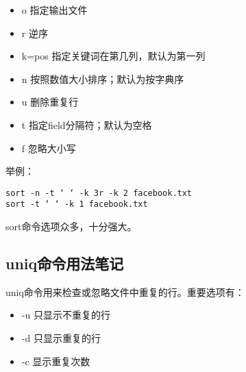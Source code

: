 \begin{itemize}
    \item o 指定输出文件
    \item r 逆序
    \item k=pos 指定关键词在第几列，默认为第一列
    \item n 按照数值大小排序；默认为按字典序
    \item u 删除重复行
    \item t 指定field分隔符；默认为空格
    \item f 忽略大小写 
\end{itemize}


举例：
\begin{verbatim}
sort -n -t ‘ ‘ -k 3r -k 2 facebook.txt
sort -t ‘ ‘ -k 1 facebook.txt
\end{verbatim}

sort命令选项众多，十分强大。
\subsection{uniq命令用法笔记}

uniq命令用来检查或忽略文件中重复的行。重要选项有：

\begin{itemize}
    \item -u 只显示不重复的行
    \item -d 只显示重复的行
    \item -c 显示重复次数
\end{itemize}


















